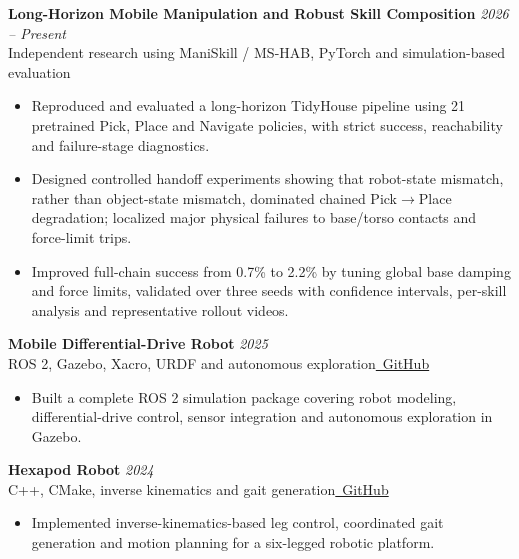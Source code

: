 \documentclass[a4paper,10pt]{article}
\newcommand{\project}[4]{%
    \noindent\textbf{#1} \hfill \textit{#2}\\
    {\small\color{descgray}#3}\hfill #4%
}
\begin{document}
\project{Long-Horizon Mobile Manipulation and Robust Skill Composition}{2026 -- Present}{Independent research using ManiSkill / MS-HAB, PyTorch and simulation-based evaluation}{}
\begin{itemize}
    \item Reproduced and evaluated a long-horizon TidyHouse pipeline using 21 pretrained Pick, Place and Navigate policies, with strict success, reachability and failure-stage diagnostics.
    \item Designed controlled handoff experiments showing that robot-state mismatch, rather than object-state mismatch, dominated chained Pick$\rightarrow$Place degradation; localized major physical failures to base/torso contacts and force-limit trips.
    \item Improved full-chain success from 0.7\% to 2.2\% by tuning global base damping and force limits, validated over three seeds with confidence intervals, per-skill analysis and representative rollout videos.
\end{itemize}
\vspace{3pt}

\project{Mobile Differential-Drive Robot}{2025}{ROS 2, Gazebo, Xacro, URDF and autonomous exploration}{\href{https://github.com/syed-nazmus-sakib/explorer-bot}{\faGithub~GitHub}}
\begin{itemize}
    \item Built a complete ROS 2 simulation package covering robot modeling, differential-drive control, sensor integration and autonomous exploration in Gazebo.
\end{itemize}
\vspace{2pt}

\project{Hexapod Robot}{2024}{C++, CMake, inverse kinematics and gait generation}{\href{https://github.com/syed-nazmus-sakib/hexapod}{\faGithub~GitHub}}
\begin{itemize}
    \item Implemented inverse-kinematics-based leg control, coordinated gait generation and motion planning for a six-legged robotic platform.
\end{itemize}

\end{document}
